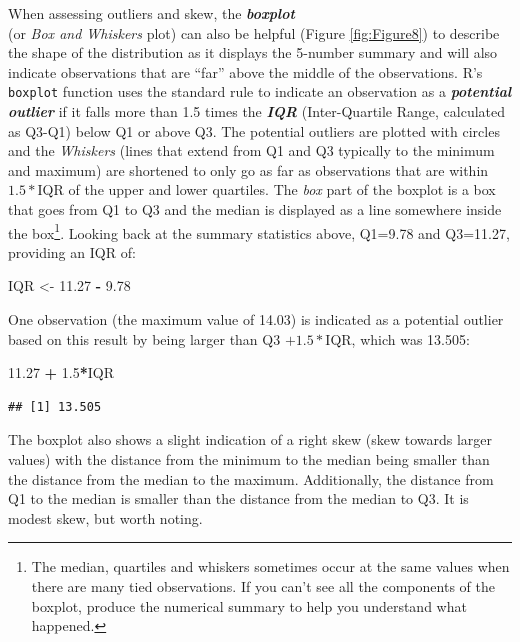 \documentclass[]{book}
\newenvironment{Shaded}{\begin{snugshade}}{\end{snugshade}}
\newcommand{\FloatTok}[1]{\textcolor[rgb]{0.00,0.00,0.81}{#1}}
\newcommand{\StringTok}[1]{\textcolor[rgb]{0.31,0.60,0.02}{#1}}
\newcommand{\OperatorTok}[1]{\textcolor[rgb]{0.81,0.36,0.00}{\textbf{#1}}}
\newcommand{\NormalTok}[1]{#1}
\let\rmarkdownfootnote\footnote%
\def\footnote{\protect\rmarkdownfootnote}
\begin{document}
When assessing outliers and skew, the \textbf{\emph{boxplot}}\\
(or \emph{Box and Whiskers} plot) can also be helpful (Figure
\ref{fig:Figure8}) to describe the shape of the distribution as it
displays the 5-number summary and will also indicate observations that
are ``far'' above the middle of the observations. R's \texttt{boxplot}
function uses the standard rule to indicate an observation as a
\textbf{\emph{potential outlier}} if it falls more than 1.5 times the
\textbf{\emph{IQR}} (Inter-Quartile Range, calculated as Q3-Q1) below Q1
or above Q3. The potential outliers are plotted with circles and the
\emph{Whiskers} (lines that extend from Q1 and Q3 typically to the
minimum and maximum) are shortened to only go as far as observations
that are within \(1.5*\)IQR of the upper and lower quartiles. The
\emph{box} part of the boxplot is a box that goes from Q1 to Q3 and the
median is displayed as a line somewhere inside the box\footnote{The
  median, quartiles and whiskers sometimes occur at the same values when
  there are many tied observations. If you can't see all the components
  of the boxplot, produce the numerical summary to help you understand
  what happened.}. Looking back at the summary statistics above, Q1=9.78
and Q3=11.27, providing an IQR of:

\begin{Shaded}
\begin{Highlighting}[]
\NormalTok{IQR <-}\StringTok{ }\FloatTok{11.27} \OperatorTok{-}\StringTok{ }\FloatTok{9.78}
\end{Highlighting}
\end{Shaded}

One observation (the maximum value of 14.03) is indicated as a potential
outlier based on this result by being larger than Q3 \(+1.5*\)IQR, which
was 13.505:

\begin{Shaded}
\begin{Highlighting}[]
\FloatTok{11.27} \OperatorTok{+}\StringTok{ }\FloatTok{1.5}\OperatorTok{*}\NormalTok{IQR}
\end{Highlighting}
\end{Shaded}

\begin{verbatim}
## [1] 13.505
\end{verbatim}

The boxplot also shows a slight indication of a right skew (skew towards
larger values) with the distance from the minimum to the median being
smaller than the distance from the median to the maximum. Additionally,
the distance from Q1 to the median is smaller than the distance from the
median to Q3. It is modest skew, but worth noting.
\end{document}

